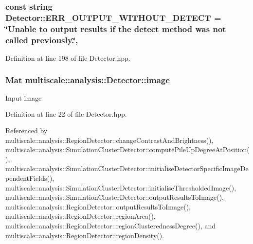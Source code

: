 \hypertarget{classmultiscale_1_1analysis_1_1Detector_a5837f0e4ffef6410774ff9bcda72238b}{
\subsubsection[{E\-R\-R\-\_\-\-O\-U\-T\-P\-U\-T\-\_\-\-W\-I\-T\-H\-O\-U\-T\-\_\-\-D\-E\-T\-E\-C\-T}]{\setlength{\rightskip}{0pt plus 5cm}const string Detector\-::\-E\-R\-R\-\_\-\-O\-U\-T\-P\-U\-T\-\_\-\-W\-I\-T\-H\-O\-U\-T\-\_\-\-D\-E\-T\-E\-C\-T = \char`\"{}Unable to output results if the {\bf detect} method was not called previously.\char`\"{}\hspace{0.3cm}{\ttfamily [static]}, {\ttfamily [protected]}}}\label{classmultiscale_1_1analysis_1_1Detector_a5837f0e4ffef6410774ff9bcda72238b}


Definition at line 198 of file Detector.\-hpp.

\hypertarget{classmultiscale_1_1analysis_1_1Detector_a523830a6cfe409694ce8327c3c736fbd}{
\subsubsection[{image}]{\setlength{\rightskip}{0pt plus 5cm}Mat multiscale\-::analysis\-::\-Detector\-::image\hspace{0.3cm}{\ttfamily [protected]}}}\label{classmultiscale_1_1analysis_1_1Detector_a523830a6cfe409694ce8327c3c736fbd}
Input image 

Definition at line 22 of file Detector.\-hpp.



Referenced by multiscale\-::analysis\-::\-Region\-Detector\-::change\-Contrast\-And\-Brightness(), multiscale\-::analysis\-::\-Simulation\-Cluster\-Detector\-::compute\-Pile\-Up\-Degree\-At\-Position(), multiscale\-::analysis\-::\-Simulation\-Cluster\-Detector\-::initialise\-Detector\-Specific\-Image\-Dependent\-Fields(), multiscale\-::analysis\-::\-Simulation\-Cluster\-Detector\-::initialise\-Thresholded\-Image(), multiscale\-::analysis\-::\-Simulation\-Cluster\-Detector\-::output\-Results\-To\-Image(), multiscale\-::analysis\-::\-Region\-Detector\-::output\-Results\-To\-Image(), multiscale\-::analysis\-::\-Region\-Detector\-::region\-Area(), multiscale\-::analysis\-::\-Region\-Detector\-::region\-Clusteredness\-Degree(), and multiscale\-::analysis\-::\-Region\-Detector\-::region\-Density().

